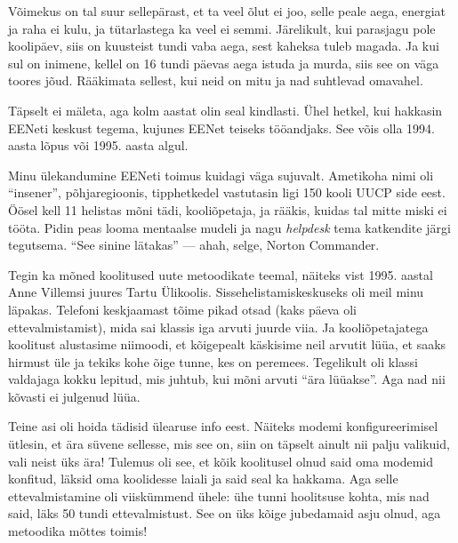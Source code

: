 
Võimekus on tal suur sellepärast, et ta veel õlut ei joo, selle peale aega, 
energiat ja raha ei kulu, ja tütarlastega ka veel ei semmi. Järelikult, kui parasjagu pole koolipäev, siis on kuusteist tundi vaba aega, 
sest kaheksa tuleb magada. Ja kui sul on inimene, kellel on 16 tundi päevas 
aega istuda ja murda, siis see on väga toores jõud. Rääkimata sellest, kui neid on mitu ja 
nad suhtlevad omavahel.


Täpselt ei mäleta, aga kolm aastat olin seal 
kindlasti. Ühel hetkel, kui hakkasin EENeti keskust 
tegema, kujunes EENet teiseks tööandjaks. See võis olla 1994. aasta lõpus või 1995. aasta algul. 

Minu ülekandumine 
EENeti toimus kuidagi väga sujuvalt. Ametikoha nimi oli \enquote{insener}, 
põhjaregioonis, tipphetkedel vastutasin ligi 150 kooli 
UUCP side eest. Öösel kell 11 helistas mõni tädi, kooliõpetaja, ja rääkis, 
kuidas tal mitte miski ei tööta. Pidin peas looma mentaalse mudeli ja 
nagu \emph{helpdesk} tema katkendite järgi tegutsema. \enquote{See sinine lätakas} 
--- ahah, selge, Norton Commander. 

Tegin ka mõned koolitused uute metoodikate teemal, näiteks vist 1995. aastal Anne Villemsi juures 
Tartu Ülikoolis. Sissehelistamiskeskuseks oli meil minu läpakas. Telefoni keskjaamast tõime 
pikad otsad (kaks päeva oli ettevalmistamist), mida sai klassis iga arvuti 
juurde viia. Ja kooliõpetajatega koolitust alustasime niimoodi, et kõigepealt 
käskisime neil arvutit lüüa, et saaks hirmust üle ja tekiks kohe õige tunne, kes on peremees. Tegelikult oli klassi valdajaga kokku 
lepitud, mis juhtub, kui mõni arvuti \enquote{ära lüüakse}. Aga nad nii kõvasti 
ei julgenud lüüa. 

Teine asi oli hoida tädisid ülearuse info eest. Näiteks modemi konfigureerimisel 
ütlesin, et ära süvene sellesse, mis see on, siin on täpselt ainult 
nii palju valikuid, vali neist üks ära! Tulemus oli see, et kõik koolitusel olnud said oma modemid konfitud, läksid oma koolidesse laiali 
ja said seal ka hakkama. Aga selle ettevalmistamine oli viiskümmend ühele: ühe tunni 
hoolitsuse kohta, mis nad said, läks 50 tundi ettevalmistust. See on üks kõige 
jubedamaid asju olnud, aga metoodika mõttes toimis! 

